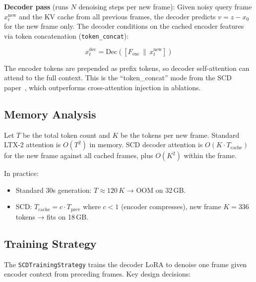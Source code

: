 \documentclass[10pt,twocolumn]{article}
\begin{document}
\textbf{Decoder pass} (runs $N$ denoising steps per new frame):
Given noisy query frame $x_t^{\text{new}}$ and the KV cache from all previous frames, the decoder predicts $v = z - x_0$ for the new frame only. The decoder conditions on the cached encoder features via token concatenation (\texttt{token\_concat}):

\begin{equation}
  x_t^{\text{dec}} = \text{Dec}\!\left([F_{\text{enc}} \,\|\, x_t^{\text{new}}]\right)
\end{equation}

The encoder tokens are prepended as prefix tokens, so decoder self-attention can attend to the full context. This is the ``token\_concat'' mode from the SCD paper~\cite{scd}, which outperforms cross-attention injection in ablations.

\subsection{Memory Analysis}

Let $T$ be the total token count and $K$ be the tokens per new frame. Standard LTX-2 attention is $O(T^2)$ in memory. SCD decoder attention is $O(K \cdot T_{\text{cache}})$ for the new frame against all cached frames, plus $O(K^2)$ within the frame.

In practice:
\begin{itemize}[nosep]
  \item Standard 30s generation: $T \approx 120\,K$ → OOM on 32\,GB.
  \item SCD: $T_{\text{cache}} = c \cdot T_{\text{prev}}$ where $c < 1$ (encoder compresses), new frame $K = 336$ tokens → fits on 18\,GB.
\end{itemize}

\subsection{Training Strategy}

The \texttt{SCDTrainingStrategy} trains the decoder LoRA to denoise one frame given encoder context from preceding frames. Key design decisions:
\end{document}
